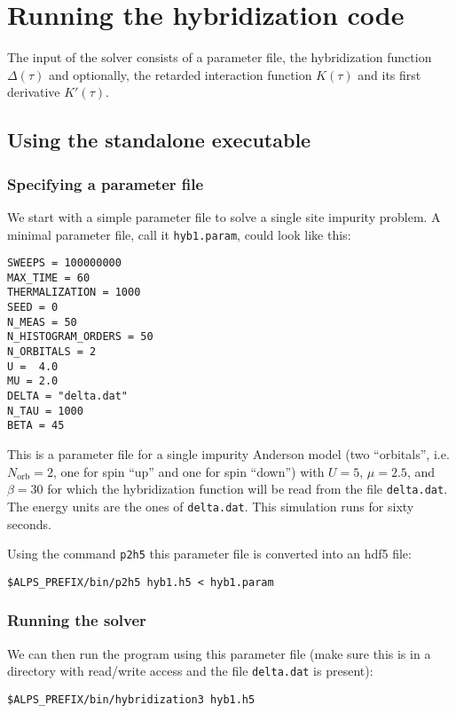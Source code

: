 \documentclass[aps,prb,floatfix,superscriptaddress,twocolumn,notitlepage]{revtex4-1}
\begin{document}
\section{Running the hybridization code}

The input of the solver consists of a parameter file, the hybridization function $\Delta(\tau)$ and optionally, the retarded interaction function $K(\tau)$ and its first derivative $K'(\tau)$.

\subsection{Using the standalone executable}

\subsubsection{Specifying a parameter file}
We start with a simple parameter file to solve a single site impurity problem. A minimal parameter file, call it \verb#hyb1.param#, could look like this:
\begin{verbatim}
SWEEPS = 100000000
MAX_TIME = 60
THERMALIZATION = 1000
SEED = 0
N_MEAS = 50
N_HISTOGRAM_ORDERS = 50
N_ORBITALS = 2
U =  4.0
MU = 2.0
DELTA = "delta.dat"
N_TAU = 1000
BETA = 45
\end{verbatim}
This is a parameter file for a single impurity Anderson model (two ``orbitals'', i.e. $N_{\text{orb}}=2$, one for spin ``up'' and one for spin ``down'') with $U=5$, $\mu=2.5$, and $\beta=30$ for which the hybridization function will be read from the file \verb#delta.dat#. The energy units are the ones of \verb#delta.dat#. This simulation runs for sixty seconds.

Using the command \verb#p2h5# this parameter file is converted into an hdf5 file:
\begin{verbatim}
$ALPS_PREFIX/bin/p2h5 hyb1.h5 < hyb1.param
\end{verbatim}

\subsubsection{Running the solver}

We can then run the program using this parameter file (make sure this is in a directory with read/write access and the file \verb#delta.dat# is present):
\begin{verbatim}
$ALPS_PREFIX/bin/hybridization3 hyb1.h5
\end{verbatim}
\end{document}
